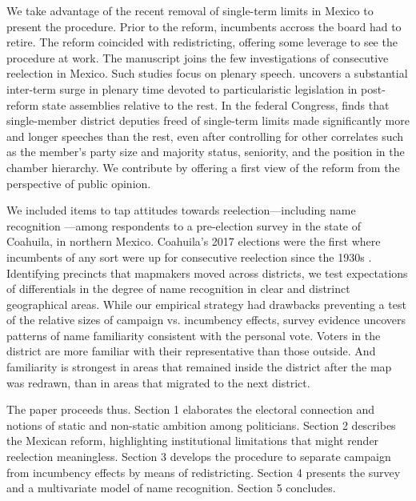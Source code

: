 \documentclass[letter,12pt]{article}
\begin{document}

We take advantage of the recent removal of single-term limits in Mexico to present the procedure. Prior to the reform, incumbents accross the board had to retire. The reform coincided with redistricting, offering some leverage to see the procedure at work. The manuscript joins the few investigations of consecutive reelection in Mexico. Such studies focus on plenary speech. \citet{motolinia-reel-pork2021} uncovers a substantial inter-term surge in plenary time devoted to particularistic legislation in post-reform state assemblies relative to the rest. In the federal Congress, \citet{magar.debate.2021} finds that single-member district deputies freed of single-term limits made significantly more and longer speeches than the rest, even after controlling for other correlates such as the member's party size and majority status, seniority, and the position in the chamber hierarchy. We contribute by offering a first view of the reform from the perspective of public opinion.

We included items to tap attitudes towards reelection---including name recognition \citep[cf.][]{cain.etal.1987}---among respondents to a pre-election survey in the state of Coahuila, in northern Mexico. Coahuila's 2017 elections were the first where incumbents of any sort were up for consecutive reelection since the 1930s \citep[see][]{magarInstReel.2017}. Identifying precincts that mapmakers moved across districts, we test expectations of differentials in the degree of name recognition in clear and distrinct geographical areas. While our empirical strategy had drawbacks preventing a test of the relative sizes of campaign vs. incumbency effects, survey evidence uncovers patterns of name familiarity consistent with the personal vote. Voters in the district are more familiar with their representative than those outside. And familiarity is strongest in areas that remained inside the district after the map was redrawn, than in areas that migrated to the next district.  

The paper proceeds thus. Section 1 elaborates the electoral connection and notions of static and non-static ambition among politicians. Section 2 describes the Mexican reform, highlighting institutional limitations that might render reelection meaningless. Section 3 develops the procedure to separate campaign from incumbency effects by means of redistricting. Section 4 presents the survey and a multivariate model of name recognition. Section 5 concludes.  
\end{document}
